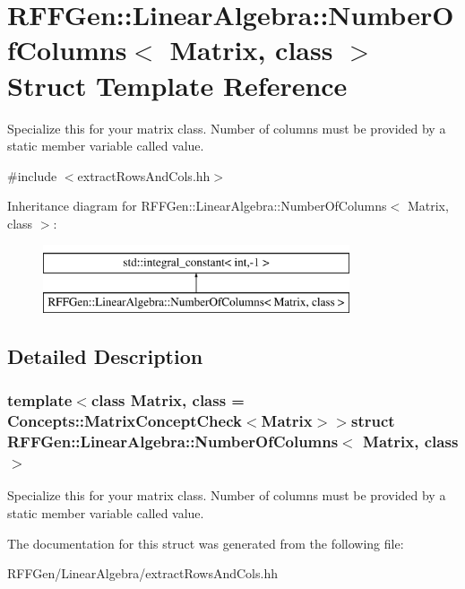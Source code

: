 \hypertarget{structRFFGen_1_1LinearAlgebra_1_1NumberOfColumns}{\section{R\-F\-F\-Gen\-:\-:Linear\-Algebra\-:\-:Number\-Of\-Columns$<$ Matrix, class $>$ Struct Template Reference}
\label{structRFFGen_1_1LinearAlgebra_1_1NumberOfColumns}
}


Specialize this for your matrix class. Number of columns must be provided by a static member variable called value.  




{\ttfamily \#include $<$extract\-Rows\-And\-Cols.\-hh$>$}

Inheritance diagram for R\-F\-F\-Gen\-:\-:Linear\-Algebra\-:\-:Number\-Of\-Columns$<$ Matrix, class $>$\-:\begin{figure}[H]
\begin{center}
\leavevmode
\includegraphics[height=2.000000cm]{structRFFGen_1_1LinearAlgebra_1_1NumberOfColumns}
\end{center}
\end{figure}


\subsection{Detailed Description}
\subsubsection*{template$<$class Matrix, class = Concepts\-::\-Matrix\-Concept\-Check$<$\-Matrix$>$$>$struct R\-F\-F\-Gen\-::\-Linear\-Algebra\-::\-Number\-Of\-Columns$<$ Matrix, class $>$}

Specialize this for your matrix class. Number of columns must be provided by a static member variable called value. 

The documentation for this struct was generated from the following file\-:\begin{DoxyCompactItemize}
\item 
R\-F\-F\-Gen/\-Linear\-Algebra/extract\-Rows\-And\-Cols.\-hh\end{DoxyCompactItemize}
